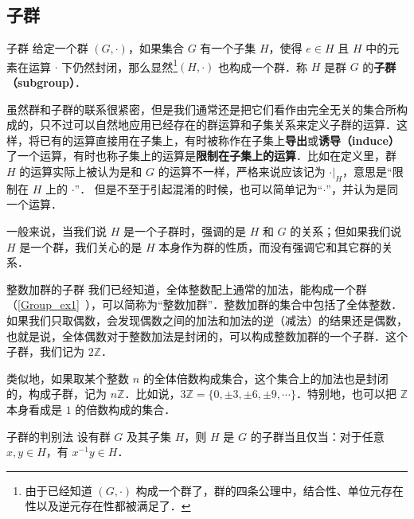

\subsection{子群}

\begin{definition}{子群}
给定一个群 $(G, \cdot)$，如果集合 $G$ 有一个子集 $H$，使得 $e\in H$ 且 $H$ 中的元素在运算 $\cdot$ 下仍然封闭，那么显然\footnote{由于已经知道 $(G,\cdot)$ 构成一个群了，群的四条公理中，结合性、单位元存在性以及逆元存在性都被满足了．}$(H,\cdot)$ 也构成一个群．称 $H$ 是群 $G$ 的\textbf{子群（subgroup）}．
\end{definition}

虽然群和子群的联系很紧密，但是我们通常还是把它们看作由完全无关的集合所构成的，只不过可以自然地应用已经存在的群运算和子集关系来定义子群的运算．这样，将已有的运算直接用在子集上，有时被称作在子集上\textbf{导出}或\textbf{诱导（induce）}了一个运算，有时也称子集上的运算是\textbf{限制在子集上的运算}．比如在定义里，群 $H$ 的运算实际上被认为是和 $G$ 的运算不一样，严格来说应该记为 $\cdot|_H$，意思是“限制在 $H$ 上的 $\cdot$”． 但是不至于引起混淆的时候，也可以简单记为“$\cdot$”，并认为是同一个运算．

一般来说，当我们说 $H$ 是一个子群时，强调的是 $H$ 和 $G$ 的关系；但如果我们说 $H$ 是一个群，我们关心的是 $H$ 本身作为群的性质，而没有强调它和其它群的关系．

\begin{example}{整数加群的子群}\label{Group1_ex1}
我们已经知道，全体整数配上通常的加法，能构成一个群（\autoref{Group_ex1}~），可以简称为“整数加群”．整数加群的集合中包括了全体整数．如果我们只取偶数，会发现偶数之间的加法和加法的逆（减法）的结果还是偶数，也就是说，全体偶数对于整数加法是封闭的，可以构成整数加群的一个子群．这个子群，我们记为 $2\mathbb{Z}$．

类似地，如果取某个整数 $n$ 的全体倍数构成集合，这个集合上的加法也是封闭的，构成子群，记为 $n\mathbb{Z}$．比如说，$3\mathbb{Z}=\{0, \pm3, \pm6, \pm9, \cdots\}$．特别地，也可以把 $\mathbb{Z}$ 本身看成是 $1$ 的倍数构成的集合．
\end{example}

\begin{theorem}{子群的判别法}\label{Group1_the3}
设有群 $G$ 及其子集 $H$，则 $H$ 是 $G$ 的子群当且仅当：对于任意 $x, y\in H$，有 $x^{-1}y\in H$．
\end{theorem}

